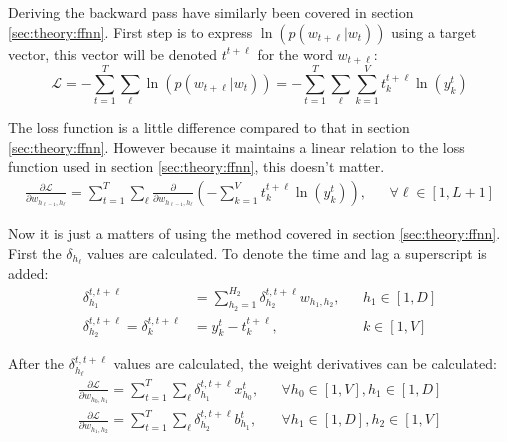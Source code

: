 Deriving the backward pass have similarly been covered in section \ref{sec:theory:ffnn}. First step is to express $\ln( p(w_{t + \ell} | w_t) )$ using a target vector, this vector will be denoted $t^{t+\ell}$ for the word $w_{t + \ell}$:
\begin{equation}
\mathcal{L} =  - \sum_{t = 1}^T \sum_{\ell} \ln( p(w_{t + \ell} | w_t)) =  - \sum_{t = 1}^T \sum_{\ell} \sum_{k=1}^V t_k^{t+\ell} \ln(y_k^t)
\end{equation}

The loss function is a little difference compared to that in section \ref{sec:theory:ffnn}. However because it maintains a linear relation to the loss function used in section \ref{sec:theory:ffnn}, this doesn't matter.
\begin{equation}
\begin{aligned}
\frac{\partial \mathcal{L}}{\partial w_{h_{\ell-1}, h_\ell}} = \sum_{t = 1}^T \sum_{\ell} \frac{\partial}{\partial w_{h_{\ell-1}, h_\ell}} \left(- \sum_{k=1}^V t_k^{t+\ell} \ln(y_k^t)\right), && \forall \ell \in [1, L + 1]
\end{aligned}
\end{equation}

Now it is just a matters of using the method covered in section \ref{sec:theory:ffnn}. First the $\delta_{h_\ell}$ values are calculated. To denote the time and lag a superscript is added:
\begin{equation}
\begin{aligned}
\delta_{h_1}^{t, t + \ell} &= \sum_{h_2=1}^{H_2} \delta_{h_2}^{t, t + \ell} w_{h_1, h_2}, && h_1 \in [1, D] \\
\delta_{h_2}^{t, t + \ell} = \delta_{k}^{t, t + \ell} &= y_k^t - t_k^{t+\ell}, && k \in [1, V]
\end{aligned}
\end{equation}

After the $\delta_{h_\ell}^{t, t+\ell}$ values are calculated, the weight derivatives can be calculated:
\begin{equation}
\begin{aligned}
\frac{\partial \mathcal{L}}{\partial w_{h_{0}, h_1}}= \sum_{t = 1}^T \sum_{\ell} \delta_{h_1}^{t, t + \ell} x_{h_0}^t, && \forall h_0 \in [1, V], h_1 \in [1, D] \\
\frac{\partial \mathcal{L}}{\partial w_{h_{1}, h_2}}= \sum_{t = 1}^T \sum_{\ell} \delta_{h_2}^{t, t + \ell} b_{h_1}^t, && \forall h_1 \in [1, D], h_2 \in [1, V]
\end{aligned}
\end{equation}
